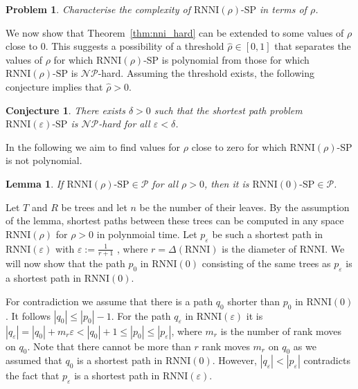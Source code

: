 \documentclass[11pt]{amsart}
\newtheorem{lemma}{Lemma}
\newtheorem{problem}{Problem}
\newtheorem{conjecture}{Conjecture}
\newcommand{\rnni}{\mathrm{RNNI}}
\newcommand{\np}{\mathcal{NP}}
\newcommand{\p}{\mathcal{P}}
\newcommand{\decprob}[1]{\rnni(#1)\text{-}\mathrm{SP}}
\renewcommand{\epsilon}{\varepsilon}
\newcommand{\summary}[1]{} %
\begin{document}
\begin{problem}
Characterise the complexity of $\decprob{\rho}$ in terms of $\rho$.
\label{prblm:rho_range}
\end{problem}

\summary{Getting one step closer to answer this question by considering small neighbourhoods for $\rho$ around zero and one}
We now show that Theorem~\ref{thm:nni_hard} can be extended to some values of $\rho$ close to $0$.
This suggests a possibility of a threshold $\hat\rho \in [0, 1]$ that separates the values of $\rho$ for which $\decprob{\rho}$ is polynomial from those for which $\decprob{\rho}$ is $\np$-hard.
Assuming the threshold exists, the following conjecture implies that $\hat\rho > 0$.

\begin{conjecture}
There exists $\delta > 0$ such that the shortest path problem $\decprob{\epsilon}$ is $\np$-hard for all $\epsilon < \delta$.
\label{prop:complexity_around_nni}
\end{conjecture}

\summary{Finding one $\rho$ between $0$ and $1$ for which $\decprob{\rho} \notin \p$}
In the following we aim to find values for $\rho$ close to zero for which $\decprob{\rho}$ is not polynomial.

\begin{lemma}
    If $\decprob{\rho} \in \p$ for all $\rho > 0$, then it is $\decprob{0} \in \p$.
    \label{lemma:if_decprob_poly}
\end{lemma}

\proof
	Let $T$ and $R$ be trees and let $n$ be the number of their leaves.
    By the assumption of the lemma, shortest paths between these trees can be computed in any space $\rnni(\rho)$ for $\rho > 0$ in polynmoial time.
	Let $p_\epsilon$ be such a shortest path in $\rnni(\epsilon)$ with $\epsilon := \frac{1}{r+1}$
	\todo{$\epsilon$ or $\rho_0$? -- $\rho_0$ results in awkward indexing: $p_{\rho_0}$}
	, where $r = \Delta(\rnni)$ is the diameter
	of $\rnni$.
    We will now show that the path $p_0$ in $\rnni(0)$ consisting of the same trees as $p_\epsilon$ is a shortest path in $\rnni(0)$.

    For contradiction we assume that there is a path $q_0$ shorter than $p_0$ in $\rnni(0)$.
    It follows $|q_0| \leq |p_0| - 1$.
    For the path $q_\epsilon$ in $\rnni(\epsilon)$ it is $|q_\epsilon| = |q_0| + m_r \epsilon < |q_0| + 1 \leq |p_0| \leq |p_\epsilon|$, where $m_r$ is the number of rank moves on $q_0$.
    Note that there cannot be more than $r$ rank moves $m_r$ on $q_0$ as we assumed that $q_0$ is a shortest path in $\rnni(0)$.
    However, $|q_\epsilon| < |p_\epsilon|$ contradicts the fact that $p_\epsilon$ is a shortest path in $\rnni(\epsilon)$.
\endproof
\end{document}
